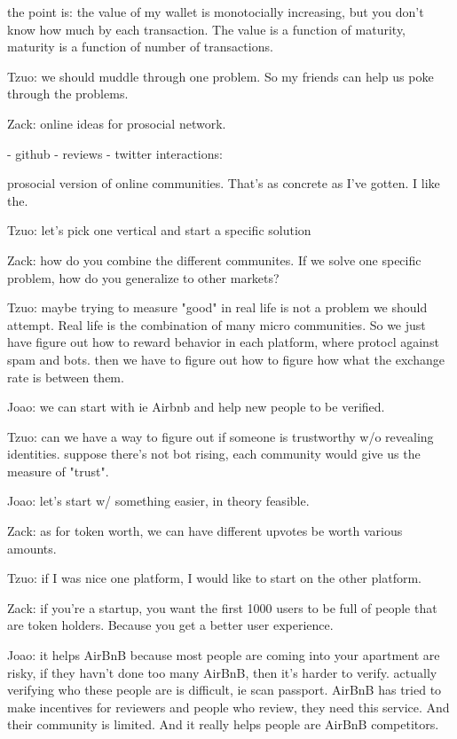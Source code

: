 the point is: the value of my wallet is monotocially increasing, but you don't know how much by each transaction. The value is a function of maturity, maturity is a function of number of transactions. 


Tzuo: we should muddle through one problem. So my friends can help us poke through the problems. 


Zack: online ideas for prosocial network.

- github
- reviews
- twitter interactions:

prosocial version of online communities. That's as concrete as I've gotten. I like the.

Tzuo: let's pick one vertical and start a specific solution

Zack: how do you combine the different communites. If we solve one specific problem, how do you generalize to other markets? 

Tzuo: maybe trying to measure "good" in real life is not a problem we should attempt. Real life is the combination of many micro communities. So we just have figure out how to reward behavior in each platform, where protocl against spam and bots. then we have to figure out how to figure how what the exchange rate is between them. 

Joao: we can start with ie Airbnb and help new people to be verified. 

Tzuo: can we have a way to figure out if someone is trustworthy w/o revealing identities. 
suppose there's not bot rising, each community would give us the measure of "trust". 

Joao: let's start w/ something easier, in theory feasible. 

Zack: as for token worth, we can have different upvotes be worth various amounts. 

Tzuo: if I was nice one platform, I would like to start on the other platform. 

Zack: if you're a startup, you want the first 1000 users to be full of people that are token holders. Because you get a better user experience. 

Joao: it helps AirBnB because most people are coming into your apartment are risky, if they havn't done too many AirBnB, then it's harder to verify. actually verifying who these people are is difficult, ie scan passport. AirBnB has tried to make incentives for reviewers and people who review, they need this service. And their community is limited. And it really helps people are AirBnB competitors. 

